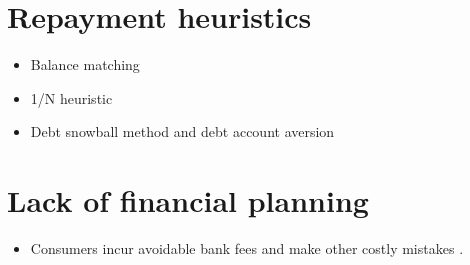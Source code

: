 \documentclass[a4paper, 11pt]{report}
\begin{document}
\section{Repayment heuristics}
\begin{itemize}
	\item Balance matching \citep{gathergood2019individuals}
	\item 1/N heuristic \citep{benartzi2001naive}
	\item Debt snowball method and debt account aversion \citep{amar2011winning}
\end{itemize}

\section{Lack of financial planning}
\begin{itemize}
	\item Consumers incur avoidable bank fees and make other costly mistakes \citep{jorring2018costs,jorring2019financial}.


\end{itemize}
\end{document}
